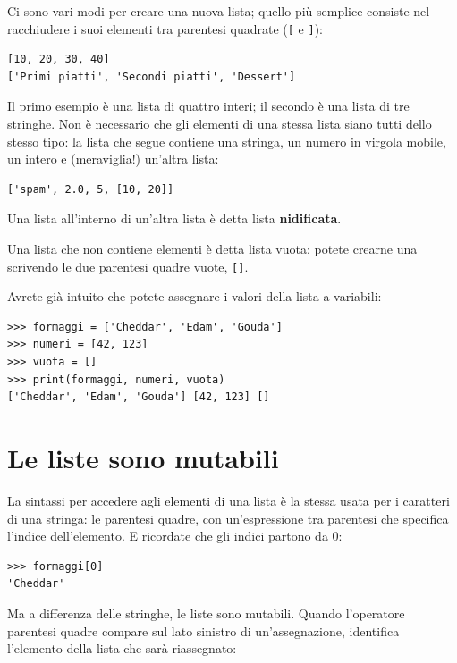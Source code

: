 \documentclass[10pt]{book}
\begin{document}
Ci sono vari modi per creare una nuova lista; quello più semplice consiste nel
racchiudere i suoi elementi tra parentesi quadrate (\verb"[" e \verb"]"):

\begin{verbatim}
[10, 20, 30, 40]
['Primi piatti', 'Secondi piatti', 'Dessert']
\end{verbatim}
%
Il primo esempio è una lista di quattro interi; il secondo è una lista
di tre stringhe. Non è necessario che gli elementi di una stessa lista siano tutti dello stesso tipo: la lista che segue contiene una stringa, un numero in virgola mobile, un intero e (meraviglia!) un'altra lista:

\begin{verbatim}
['spam', 2.0, 5, [10, 20]]
\end{verbatim}
%
Una lista all'interno di un'altra lista è detta lista {\bf nidificata}.

Una lista che non contiene elementi è detta lista vuota; potete crearne una scrivendo le due parentesi quadre vuote, \verb"[]".

Avrete già intuito che potete assegnare i valori della lista a variabili:

\begin{verbatim}
>>> formaggi = ['Cheddar', 'Edam', 'Gouda']
>>> numeri = [42, 123]
>>> vuota = []
>>> print(formaggi, numeri, vuota)
['Cheddar', 'Edam', 'Gouda'] [42, 123] []
\end{verbatim}
%


\section{Le liste sono mutabili}
\label{mutable}

La sintassi per accedere agli elementi di una lista è la stessa usata per i caratteri di una stringa: le parentesi quadre, con un'espressione tra parentesi che specifica l'indice dell'elemento. E ricordate che gli indici partono da 0:

\begin{verbatim}
>>> formaggi[0]
'Cheddar'
\end{verbatim}
%
Ma a differenza delle stringhe, le liste sono mutabili. Quando l'operatore parentesi quadre compare sul lato sinistro di un'assegnazione, identifica l'elemento della lista che sarà riassegnato:
\end{document}
